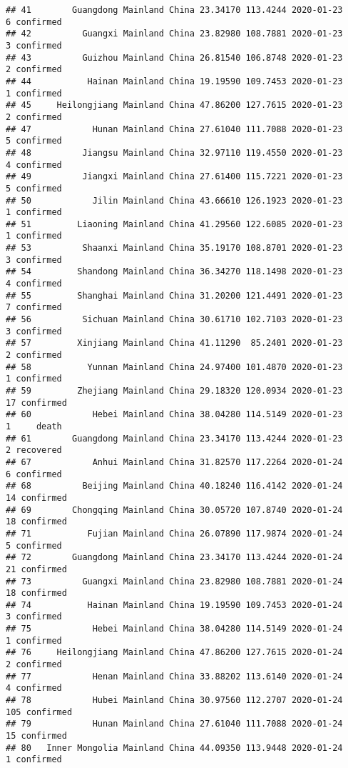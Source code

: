 \documentclass[
]{article}
\begin{document}
\begin{verbatim}
## 41        Guangdong Mainland China 23.34170 113.4244 2020-01-23     6 confirmed
## 42          Guangxi Mainland China 23.82980 108.7881 2020-01-23     3 confirmed
## 43          Guizhou Mainland China 26.81540 106.8748 2020-01-23     2 confirmed
## 44           Hainan Mainland China 19.19590 109.7453 2020-01-23     1 confirmed
## 45     Heilongjiang Mainland China 47.86200 127.7615 2020-01-23     2 confirmed
## 47            Hunan Mainland China 27.61040 111.7088 2020-01-23     5 confirmed
## 48          Jiangsu Mainland China 32.97110 119.4550 2020-01-23     4 confirmed
## 49          Jiangxi Mainland China 27.61400 115.7221 2020-01-23     5 confirmed
## 50            Jilin Mainland China 43.66610 126.1923 2020-01-23     1 confirmed
## 51         Liaoning Mainland China 41.29560 122.6085 2020-01-23     1 confirmed
## 53          Shaanxi Mainland China 35.19170 108.8701 2020-01-23     3 confirmed
## 54         Shandong Mainland China 36.34270 118.1498 2020-01-23     4 confirmed
## 55         Shanghai Mainland China 31.20200 121.4491 2020-01-23     7 confirmed
## 56          Sichuan Mainland China 30.61710 102.7103 2020-01-23     3 confirmed
## 57         Xinjiang Mainland China 41.11290  85.2401 2020-01-23     2 confirmed
## 58           Yunnan Mainland China 24.97400 101.4870 2020-01-23     1 confirmed
## 59         Zhejiang Mainland China 29.18320 120.0934 2020-01-23    17 confirmed
## 60            Hebei Mainland China 38.04280 114.5149 2020-01-23     1     death
## 61        Guangdong Mainland China 23.34170 113.4244 2020-01-23     2 recovered
## 67            Anhui Mainland China 31.82570 117.2264 2020-01-24     6 confirmed
## 68          Beijing Mainland China 40.18240 116.4142 2020-01-24    14 confirmed
## 69        Chongqing Mainland China 30.05720 107.8740 2020-01-24    18 confirmed
## 71           Fujian Mainland China 26.07890 117.9874 2020-01-24     5 confirmed
## 72        Guangdong Mainland China 23.34170 113.4244 2020-01-24    21 confirmed
## 73          Guangxi Mainland China 23.82980 108.7881 2020-01-24    18 confirmed
## 74           Hainan Mainland China 19.19590 109.7453 2020-01-24     3 confirmed
## 75            Hebei Mainland China 38.04280 114.5149 2020-01-24     1 confirmed
## 76     Heilongjiang Mainland China 47.86200 127.7615 2020-01-24     2 confirmed
## 77            Henan Mainland China 33.88202 113.6140 2020-01-24     4 confirmed
## 78            Hubei Mainland China 30.97560 112.2707 2020-01-24   105 confirmed
## 79            Hunan Mainland China 27.61040 111.7088 2020-01-24    15 confirmed
## 80   Inner Mongolia Mainland China 44.09350 113.9448 2020-01-24     1 confirmed

\end{verbatim}
\end{document}
